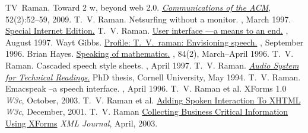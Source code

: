 \documentclass{article}
\begin{document}
\begin{plainbibliography}{}
TV~Raman.
\newblock Toward 2 w, beyond web 2.0.
\newblock \href{http://emacspeak.sourceforge.net/raman/publications/beyond-web20-cacm-2009/}{\em Communications of the ACM}, 52(2):52--59, 2009.
 T.~V. Raman.  
\newblock Netsurfing without a monitor.  
, March 1997.
\newblock \href{http://www.sciam.com/0397issue/0397raman.html}%
{Special Internet Edition.}
 T.~V.  Raman.  
\newblock
\href{http://www.ddj.com/editorial/1997/raman.htm}%
{User interface ---a means to an end.}  
, August 1997.
 Wayt Gibbs.  
\newblock
\href{http://www.sciam.com/0996issue/0996profile.html}%
{Profile: T.\ V.\ raman: Envisioning speech.}  
, September 1996.
 Brian Hayes.
\newblock  \href{http://www.amsci.org/amsci/issues/Comsci96/compsci96-03.html}%
{Speaking of mathematics.}  
,
84(2), March--April 1996.
 T.~V. Raman.  
\newblock Cascaded speech
  style sheets.  
, April
  1997.
 T.~V.  Raman.  
\newblock
\href{http://www.cs.cornell.edu/home/raman/aster/aster-toplevel.html}%
{{\em Audio System for Technical Readings}.}  
\newblock PhD
thesis, Cornell University, May 1994.
 T.~V.  Raman.  
\newblock Emacspeak --a
  speech interface.  
, April 1996.
 T.~V.  Raman et al.  
\newblock XForms 1.0 
\newblock \emph{W3c}, October, 2003.  
\newblock
 T.~V.  Raman et al.  
\newblock
  \href{http://www.w3.org/tr/xml-events}{Adding Spoken Interaction To XHTML} 
\newblock \emph{W3c}, December, 2001.  
 T.~V.  Raman 
\newblock \href{http://www.sys-con.com/xml/article.cfm?id=578}%
{Collecting Business Critical Information Using XForms} 
\newblock
  \emph{XML Journal}, April, 2003.
\end{plainbibliography}
\end{document}

